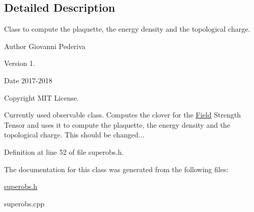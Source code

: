 \subsection{Detailed Description}
Class to compute the plaquette, the energy density and the topological charge. 

\begin{DoxyAuthor}{Author}
Giovanni Pederiva 
\end{DoxyAuthor}
\begin{DoxyVersion}{Version}
1. 
\end{DoxyVersion}
\begin{DoxyDate}{Date}
2017-\/2018 
\end{DoxyDate}
\begin{DoxyCopyright}{Copyright}
M\+IT License.
\end{DoxyCopyright}
Currently used observable class. Computes the clover for the \hyperlink{classField}{Field} Strength Tensor and uses it to compute the plaquette, the energy density and the topological charge. This should be changed... 

Definition at line 52 of file superobs.\+h.



The documentation for this class was generated from the following files\+:\begin{DoxyCompactItemize}
\item 
\hyperlink{superobs_8h}{superobs.\+h}\item 
superobs.\+cpp\end{DoxyCompactItemize}
